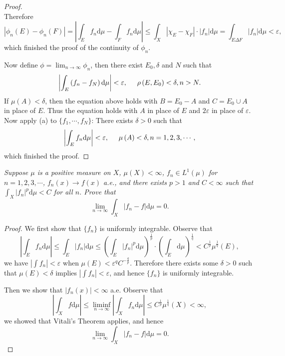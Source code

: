 \begin{proof}
$$$$
Therefore 
$$
\left| \phi _n\left( E \right) -\phi _n\left( F \right) \right|=\left| \int_E{f_n\mathrm{d}\mu}-\int_F{f_n\mathrm{d}\mu} \right|\le \int_X{\left| \chi _E-\chi _F \right|\cdot \left| f_n \right|\mathrm{d}\mu}=\int_{E\Delta F}{\left| f_n \right|\mathrm{d}\mu}<\varepsilon ,
$$
which finished the proof of the continuity of $\phi_n$.\par
Now define $\phi=\lim_{n\to\infty}\phi_n$, then there exist $E_0,\delta$ and $N$ such that 
$$
\left| \int_E{\left( f_n-f_N \right) \mathrm{d}\mu} \right|<\varepsilon ,\hspace{0.5cm}\rho \left( E,E_0 \right) <\delta ,n>N.
$$
If $\mu(A)<\delta$, then the equation above holds with $B=E_0-A$ and $C=E_0\cup A$ in place of $E$. Thus the equation holds with $A$ in place of $E$ and $2\varepsilon$ in place of $\varepsilon$. Now apply (a) to $\{f_1,\cdots,f_N\}$: There exists $\delta>0$ such that 
$$
\left| \int_E{f_n\mathrm{d}\mu} \right|<\varepsilon ,\hspace{0.5cm}\mu \left( A \right) <\delta ,n=1,2,3,\cdots ,
$$
which finished the proof.
\end{proof}
\begin{problem}\em
Suppose $\mu$ is a positive measure on $X$, $\mu(X)<\infty$, $f_n\in L^1(\mu)$ for $n=1,2,3,\cdots$, $f_n(x)\to f(x)$ a.e., and there exists $p>1$ and $C<\infty$ such that $\int_X|f_n|^p\mathrm{d}\mu<C$ for all $n$. Prove that 
$$
\lim_{n\rightarrow \infty} \int_X{\left| f_n-f \right|\mathrm{d}\mu}=0.
$$
\end{problem}
\begin{proof}
We first show that $\{f_n\}$ is uniformly integrable. Observe that 
$$
\left| \int_E{f_n\mathrm{d}\mu} \right|\le \int_E{\left| f_n \right|\mathrm{d}\mu}\le \left( \int_E{\left| f_n \right|^p\mathrm{d}\mu} \right) ^{\frac{1}{p}}\cdot \left( \int_E{\mathrm{d}\mu} \right) ^{\frac{1}{q}}<C^{\frac{1}{p}}\mu ^{\frac{1}{q}}\left( E \right) ,
$$
we have $|\int f_n|<\varepsilon$ when $\mu(E)<\varepsilon^qC^{-\frac{q}{p}}$. Therefore there exists some $\delta>0$ such that $\mu(E)<\delta$ implies $|\int f_n|<\varepsilon$, and hence $\{f_n\}$ is uniformly integrable.\par
Then we show that $|f_n(x)|<\infty$ a.e. Observe that 
$$
\left| \int_X{f\mathrm{d}\mu} \right|\le \mathop {\lim\mathrm{inf}} \limits_{n\rightarrow \infty}\left| \int_X{f_n\mathrm{d}\mu} \right|\le C^{\frac{1}{p}}\mu ^{\frac{1}{q}}\left( X \right) <\infty ,
$$
we showed that Vitali's Theorem applies, and hence 
$$
\lim_{n\rightarrow \infty} \int_X{\left| f_n-f \right|\mathrm{d}\mu}=0.
$$
\end{proof}
\newpage
